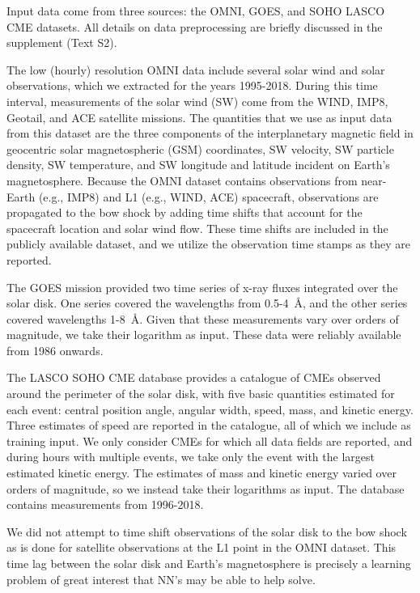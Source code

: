 \documentclass[draft,linenumbers]{agujournal2018}
\begin{document}
Input data come from three sources: the OMNI, GOES, and SOHO LASCO CME datasets. All details on data preprocessing are briefly discussed in the supplement (Text S2).

The low (hourly) resolution OMNI data include several solar wind and solar observations, which we extracted for the years 1995-2018. During this time interval, measurements of the solar wind (SW) come from the WIND, IMP8, Geotail, and ACE satellite missions. The quantities that we use as input data from this dataset are the three components of the interplanetary magnetic field in geocentric solar magnetospheric (GSM) coordinates, SW velocity, SW particle density, SW temperature, and SW longitude and latitude incident on Earth's magnetosphere. Because the OMNI dataset contains observations from near-Earth (e.g., IMP8) and L1 (e.g., WIND, ACE) spacecraft, observations are propagated to the bow shock by adding time shifts that account for the spacecraft location and solar wind flow. These time shifts are included in the publicly available dataset, and we utilize the observation time stamps as they are reported.

The GOES mission provided two time series of x-ray fluxes integrated over the solar disk. One series covered the wavelengths from 0.5-4~\r{A}, and the other series covered wavelengths 1-8~\r{A}. Given that these measurements vary over orders of magnitude, we take their logarithm as input. These data were reliably available from 1986 onwards.

The LASCO SOHO CME database provides a catalogue of CMEs observed around the perimeter of the solar disk, with five basic quantities estimated for each event: central position angle, angular width, speed, mass, and kinetic energy. Three estimates of speed are reported in the catalogue, all of which we include as training input. We only consider CMEs for which all data fields are reported, and during hours with multiple events, we take only the event with the largest estimated kinetic energy. The estimates of mass and kinetic energy varied over orders of magnitude, so we instead take their logarithms as input. The database contains measurements from 1996-2018.

We did not attempt to time shift observations of the solar disk to the bow shock as is done for satellite observations at the L1 point in the OMNI dataset. This time lag between the solar disk and Earth's magnetosphere is precisely a learning problem of great interest that NN's may be able to help solve.
\end{document}
